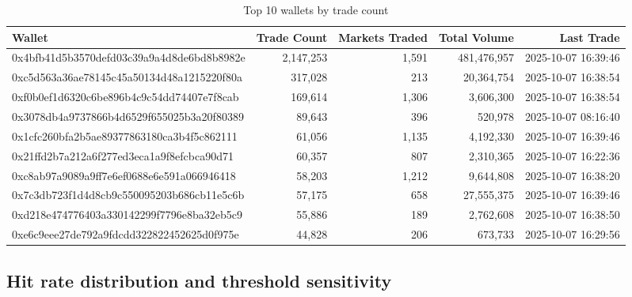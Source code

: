 \documentclass[11pt,a4paper]{article}
\newcommand{\edit}[1]{#1}
\begin{document}

\begin{table}[H]
\centering
\scriptsize
\setlength{\tabcolsep}{4pt}
\begin{adjustbox}{max width=\textwidth}
\begin{tabular}{lrrrr}
\toprule
Wallet & Trade Count & Markets Traded & Total Volume & Last Trade \\
\midrule
0x4bfb41d5b3570defd03c39a9a4d8de6bd8b8982e & \edit{2,147,253} & \edit{1,591} & \edit{481,476,957} & 2025-10-07 16:39:46 \\
0xc5d563a36ae78145c45a50134d48a1215220f80a & 317,028 & 213 & 20,364,754 & 2025-10-07 16:38:54 \\
0xf0b0ef1d6320c6be896b4c9c54dd74407e7f8cab & \edit{169,614} & \edit{1,306} & \edit{3,606,300} & 2025-10-07 16:38:54 \\
0x3078db4a9737866b4d6529f655025b3a20f80389 & \edit{89,643} & \edit{396} & \edit{520,978} & 2025-10-07 08:16:40 \\
0x1cfc260bfa2b5ae89377863180ca3b4f5c862111 & \edit{61,056} & \edit{1,135} & \edit{4,192,330} & 2025-10-07 16:39:46 \\
0x21ffd2b7a212a6f277ed3eca1a9f8efcbca90d71 & \edit{60,357} & \edit{807} & \edit{2,310,365} & 2025-10-07 16:22:36 \\
0xc8ab97a9089a9ff7e6ef0688e6e591a066946418 & \edit{58,203} & \edit{1,212} & \edit{9,644,808} & 2025-10-07 16:38:20 \\
0x7c3db723f1d4d8cb9c550095203b686cb11e5c6b & \edit{57,175} & \edit{658} & \edit{27,555,375} & 2025-10-07 16:39:46 \\
0xd218e474776403a330142299f7796e8ba32eb5c9 & 55,886 & 189 & 2,762,608 & 2025-10-07 16:38:50 \\
0xe6c9eee27de792a9fdcdd322822452625d0f975e & 44,828 & 206 & 673,733 & 2025-10-07 16:29:56 \\
\bottomrule
\end{tabular}
\end{adjustbox}
\caption{Top 10 wallets by trade count}
\label{tab:top10_wallets_trade_count}
\end{table}
\subsection{Hit rate distribution and threshold sensitivity}
\end{document}
